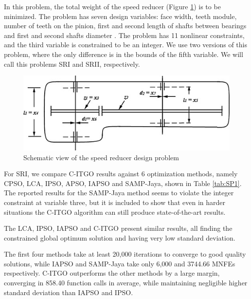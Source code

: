 In this problem, the total weight of the speed reducer (Figure \ref{fig:SR}) is to be minimized. The problem has seven design variables: face width, teeth module, number of teeth on the pinion, first and second length of shafts between bearings and first and second shafts diameter \citep{SR}. The problem has 11 nonlinear constraints, and the third variable is constrained to be an integer. We use two versions of this problem, where the only difference is in the bounds of the fifth variable. We will call this problems SRI and SRII, respectively.


\begin{figure}[h]
\begin{center}
\includegraphics[scale=0.6]{Imgs/SR.jpg}
\end{center}
\captionsetup{justification=centering}
\caption{Schematic view of the speed reducer design problem}\label{fig:SR}
\end{figure}

For SRI, we compare C-ITGO results against 6 optimization methods, namely CPSO, LCA, IPSO, APSO, IAPSO and SAMP-Jaya, shown in Table \ref{tab:SP1}. The reported results for the SAMP-Jaya method seems to violate the integer constraint at variable three, but it is included to show that even in harder situations the C-ITGO algorithm can still produce state-of-the-art results.

The LCA, IPSO, IAPSO and C-ITGO present similar results, all finding the constrained global optimum solution and having very low standard deviation.




The first four methods take at least 20,000 iterations to converge to good quality solutions, while IAPSO and SAMP-Jaya take only 6,000 and 3744.66 MNFEs respectively. C-ITGO outperforms the other methods by a large margin, converging in 858.40 function calls in average, while maintaining negligible higher standard deviation than IAPSO and IPSO.

